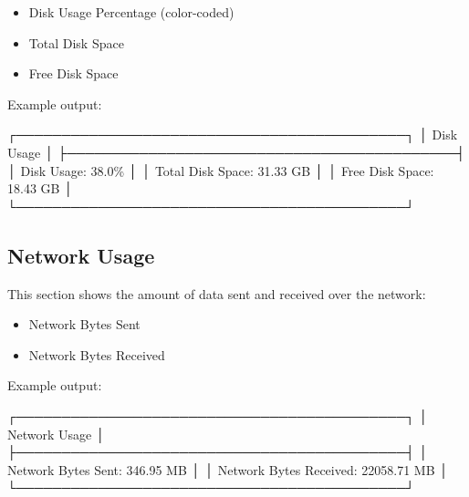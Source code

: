 \documentclass[
  letterpaper,
  DIV=11,
  numbers=noendperiod]{scrreprt}
\newenvironment{Shaded}{\begin{snugshade}}{\end{snugshade}}
\newcommand{\ExtensionTok}[1]{\textcolor[rgb]{0.00,0.23,0.31}{#1}}
\newcommand{\NormalTok}[1]{\textcolor[rgb]{0.00,0.23,0.31}{#1}}
\providecommand{\tightlist}{%
  \setlength{\itemsep}{0pt}\setlength{\parskip}{0pt}}\usepackage{longtable,booktabs,array}
\begin{document}
\begin{itemize}
\tightlist
\item
  Disk Usage Percentage (color-coded)
\item
  Total Disk Space
\item
  Free Disk Space
\end{itemize}

Example output:

\begin{Shaded}
\begin{Highlighting}[]
\ExtensionTok{┌───────────────────────────────────────────┐}
\ExtensionTok{│}\NormalTok{ Disk Usage                                │}
\ExtensionTok{├───────────────────────────────────────────┤}
\ExtensionTok{│}\NormalTok{ Disk Usage: 38.0\%                         │}
\ExtensionTok{│}\NormalTok{ Total Disk Space: 31.33 GB                │}
\ExtensionTok{│}\NormalTok{ Free Disk Space: 18.43 GB                 │}
\ExtensionTok{└───────────────────────────────────────────┘}
\end{Highlighting}
\end{Shaded}

\subsection*{Network Usage}\label{network-usage}

This section shows the amount of data sent and received over the
network:

\begin{itemize}
\tightlist
\item
  Network Bytes Sent
\item
  Network Bytes Received
\end{itemize}

Example output:

\begin{Shaded}
\begin{Highlighting}[]
\ExtensionTok{┌───────────────────────────────────────────┐}
\ExtensionTok{│}\NormalTok{ Network Usage                             │}
\ExtensionTok{├───────────────────────────────────────────┤}
\ExtensionTok{│}\NormalTok{ Network Bytes Sent: 346.95 MB             │}
\ExtensionTok{│}\NormalTok{ Network Bytes Received: 22058.71 MB       │}
\ExtensionTok{└───────────────────────────────────────────┘}
\end{Highlighting}
\end{Shaded}
\end{document}
